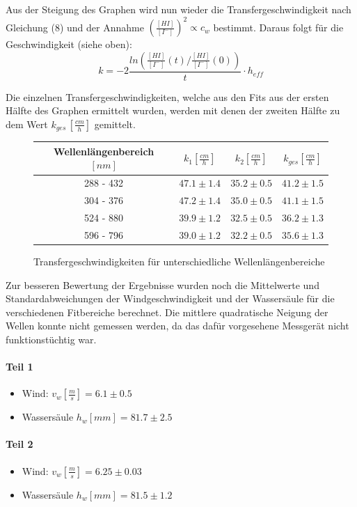\documentclass[12pt]{article}
\begin{document}
Aus der Steigung des Graphen wird nun wieder die Transfergeschwindigkeit nach Gleichung (8) und der Annahme $(\frac{[HI]}{[I^-]})^2 \propto c_w $ bestimmt.
Daraus folgt für die Geschwindigkeit (siehe oben):
\begin{equation}
k = -2 \frac{ln(\frac{[HI]}{[I^-]}(t)/\frac{[HI]}{[I^-]}(0))}{t} \cdot h_{eff}
\end{equation}

Die einzelnen Transfergeschwindigkeiten, welche aus den Fits aus der ersten Hälfte des Graphen ermittelt wurden, werden mit denen der zweiten Hälfte zu dem Wert $k_{ges} \, [\frac{cm}{h}]$ gemittelt.

\begin{figure}[H]
	\centering
	\begin{tabular}{c|c|c|c}
		Wellenlängenbereich $[nm]$ & $k_1 [\frac{cm}{h}]$ & $k_2 [\frac{cm}{h}]$ & $k_{ges} [\frac{cm}{h}] $ \\ \hline
		288 - 432 & $47.1 \pm 1.4$ & $35.2 \pm 0.5$ & $41.2 \pm 1.5$ \\
		304 - 376 & $47.2 \pm 1.4$ & $35.0 \pm 0.5$ & $41.1 \pm 1.5$ \\
		524 - 880 & $39.9 \pm 1.2$ & $32.5 \pm 0.5$ & $36.2 \pm 1.3$ \\
    	596 - 796 & $39.0 \pm 1.2$ & $32.2 \pm 0.5$ & $35.6 \pm 1.3$
	\end{tabular}
	\caption{Transfergeschwindigkeiten für unterschiedliche Wellenlängenbereiche}
\end{figure}

Zur besseren Bewertung der Ergebnisse wurden noch die Mittelwerte und Standardabweichungen der Windgeschwindigkeit und der Wassersäule für die verschiedenen Fitbereiche berechnet. Die mittlere quadratische Neigung der Wellen konnte nicht gemessen werden, da das dafür vorgesehene Messgerät nicht funktionstüchtig war.

\paragraph{Teil 1}
\begin{itemize}
	\item Wind: $v_w [\frac{m}{s}] = 6.1 \pm 0.5 $
	\item Wassersäule $h_w[mm] = 81.7 \pm 2.5 $
\end{itemize}
\paragraph{Teil 2}
\begin{itemize}
	\item Wind: $v_w [\frac{m}{s}] = 6.25 \pm 0.03 $
	\item Wassersäule $h_w[mm] = 81.5 \pm 1.2 $
\end{itemize}
\end{document}
